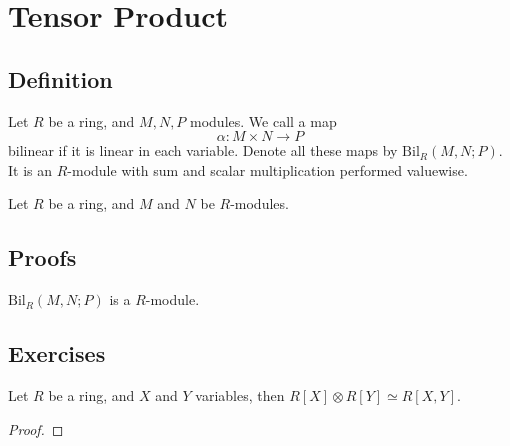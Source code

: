 \chapter{Tensor Product}

\section{Definition}

\begin{defn}
    Let \(R\) be a ring, and \(M, N, P\) modules. We call a map
    \begin{equation}
        \alpha: M \times N \longrightarrow P
    \end{equation}
    bilinear if it is linear in each variable. Denote all these maps by \(\mathrm{Bil}_R(M, N; P)\). It is an \(R\)-module with sum and scalar multiplication performed valuewise.
\end{defn}

\begin{defn}
    Let \(R\) be a ring, and \(M\) and \(N\) be \(R\)-modules.
\end{defn}

\section{Proofs}

\begin{prps}
    \(\mathrm{Bil}_R(M, N; P)\) is a \(R\)-module.
\end{prps}

\section{Exercises}

\begin{exr}
    Let \(R\) be a ring, and \(X\) and \(Y\) variables, then \(R[X] \otimes R[Y] \simeq R[X, Y]\).
\end{exr}

\begin{proof}
    
\end{proof}